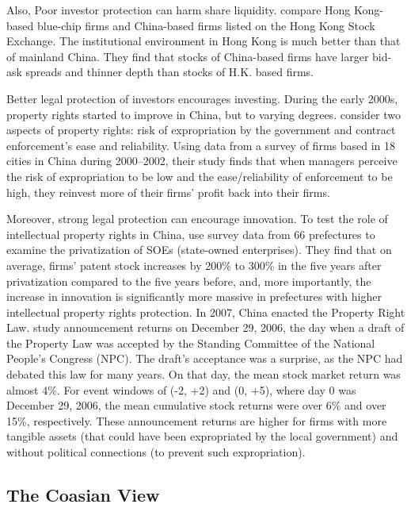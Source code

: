 \documentclass[final,1p,authoryear]{elsarticle}
\begin{document}
Also, Poor investor protection can harm share liquidity. \cite{doi:10.1111/1540-6261.00551} compare Hong Kong-based blue-chip firms and China-based firms listed on the Hong Kong Stock Exchange. The institutional environment in Hong Kong is much better than that of mainland China. They find that stocks of China-based firms have larger bid-ask spreads and thinner depth than stocks of H.K. based firms.

Better legal protection of investors encourages investing. During the early 2000s, property rights started to improve in China, but to varying degrees. \cite{RePEc:eee:jfinec:v:77:y:2005:i:1:p:117-146} consider two aspects of property rights: risk of expropriation by the government and contract enforcement's ease and reliability. Using data from a survey of firms based in 18 cities in China during 2000–2002, their study finds that when managers perceive the risk of expropriation to be low and the ease/reliability of enforcement to be high, they reinvest more of their firms' profit back into their firms.

Moreover, strong legal protection can encourage innovation. To test the role of intellectual property rights in China, \cite{RePEc:oup:rfinst:v:30:y:2017:i:7:p:2446-2477.} use survey data from 66 prefectures to examine the privatization of SOEs (state-owned enterprises). They find that on average, firms' patent stock increases by 200\% to 300\% in the five years after privatization compared to the five years before, and, more importantly, the increase in innovation is significantly more massive in prefectures with higher intellectual property rights protection. In 2007, China enacted the Property Right Law. \cite{RePEc:eee:jfinec:v:116:y:2015:i:3:p:583-593} study announcement returns on December 29, 2006, the day when a draft of the Property Law was accepted by the Standing Committee of the National People's Congress (NPC). The draft's acceptance was a surprise, as the NPC had debated this law for many years. On that day, the mean stock market return was almost 4\%. For event windows of (-2, +2) and (0, +5), where day 0 was December 29, 2006, the mean cumulative stock returns were over 6\% and over 15\%, respectively. These announcement returns are higher for firms with more tangible assets (that could have been expropriated by the local government) and without political connections (to prevent such expropriation).


\subsection{The Coasian View}
\end{document}
